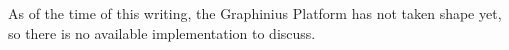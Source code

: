 As of the time of this writing, the Graphinius Platform has not taken shape yet, so there is no available implementation to discuss.



